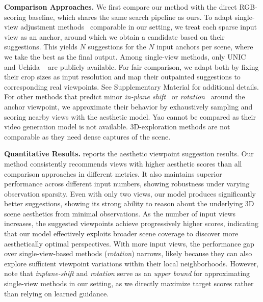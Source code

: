 \noindent\textbf{Comparison Approaches.} We first compare our method with the direct RGB-scoring baseline, which shares the same search pipeline as ours. To adapt single-view adjustment methods~\cite{li2025towards,su2021camera,uchida20253d,liu2023beyond,yao2025photography,sheng2024view} comparable in our setting, we treat each sparse input view as an anchor, around which we obtain a candidate based on their suggestions. This yields $N$ suggestions for the $N$ input anchors per scene, where we take the best as the final output. 
Among single-view methods, only UNIC~\cite{liu2023beyond} and Uchida \etal~\cite{uchida20253d} are publicly available. 
For fair comparison, we adapt both by fixing their crop sizes as input resolution and map their outpainted suggestions to corresponding real viewpoints. See Supplementary Material for additional details.
For other methods that predict minor \textit{in-plane shift}~\cite{su2021camera,sheng2024view} or \textit{rotation}~\cite{li2025towards} around the anchor viewpoint, we approximate their behavior by exhaustively sampling and scoring nearby views with the aesthetic model. Yao \etal\cite{yao2025photography} cannot be compared as their video generation model is not available. 3D-exploration methods are not comparable as they need dense captures of the scene.

\noindent\textbf{Quantitative Results.}  reports the aesthetic viewpoint suggestion results.  
Our method consistently recommends views with higher aesthetic scores than all comparison approaches in different metrics.
It also maintains superior performance across different input numbers, showing robustness under varying observation sparsity. 
Even with only two views, our model produces significantly better suggestions, showing its strong ability to reason about the underlying 3D scene aesthetics from minimal observations.
As the number of input views increases, the suggested viewpoints achieve progressively higher scores, indicating that our model effectively exploits broader scene coverage to discover more aesthetically optimal perspectives.
With more input views, the performance gap over single-view-based methods (\eg \textit{rotation}) narrows, likely because they can also explore sufficient viewpoint variations within their local neighborhoods. However, note that \textit{inplane-shift} and \textit{rotation} serve as an \textit{upper bound} for approximating single-view methods in our setting, as we directly maximize target scores rather than relying on learned guidance.



